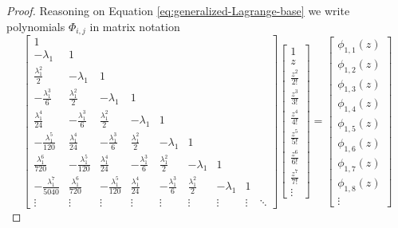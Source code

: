 \begin{proof}
Reasoning on Equation \ref{eq:generalized-Lagrange-base} we write polynomials
$\Phi_{i,j}$ in matrix notation
\begin{equation}
\label{eq:Ez-product}
    \left[\begin{matrix}1 &  &  &  &  &  &  & \\- \lambda_{1} & 1 &  &  &  &  &  & \\\frac{\lambda_{1}^{2}}{2} & - \lambda_{1} & 1 &  &  &  &  & \\- \frac{\lambda_{1}^{3}}{6} & \frac{\lambda_{1}^{2}}{2} & - \lambda_{1} & 1 &  &  &  & \\\frac{\lambda_{1}^{4}}{24} & - \frac{\lambda_{1}^{3}}{6} & \frac{\lambda_{1}^{2}}{2} & - \lambda_{1} & 1 &  &  & \\- \frac{\lambda_{1}^{5}}{120} & \frac{\lambda_{1}^{4}}{24} & - \frac{\lambda_{1}^{3}}{6} & \frac{\lambda_{1}^{2}}{2} & - \lambda_{1} & 1 &  & \\\frac{\lambda_{1}^{6}}{720} & - \frac{\lambda_{1}^{5}}{120} & \frac{\lambda_{1}^{4}}{24} & - \frac{\lambda_{1}^{3}}{6} & \frac{\lambda_{1}^{2}}{2} & - \lambda_{1} & 1 & \\- \frac{\lambda_{1}^{7}}{5040} & \frac{\lambda_{1}^{6}}{720} & - \frac{\lambda_{1}^{5}}{120} & \frac{\lambda_{1}^{4}}{24} & - \frac{\lambda_{1}^{3}}{6} & \frac{\lambda_{1}^{2}}{2} & - \lambda_{1} & 1 \\ \vdots & \vdots & \vdots & \vdots & \vdots & \vdots & \vdots & \vdots & \ddots  \end{matrix}\right] \left[\begin{matrix}1\\z\\\frac{z^{2}}{2!}\\\frac{z^{3}}{3!}\\\frac{z^{4}}{4!}\\\frac{z^{5}}{5!}\\\frac{z^{6}}{6!}\\\frac{z^{7}}{7!}\\\vdots\end{matrix}\right] = \left[\begin{matrix}\phi_{ 1, 1 }{\left (z \right )}\\\phi_{ 1, 2 }{\left (z \right )}\\\phi_{ 1, 3 }{\left (z \right )}\\\phi_{ 1, 4 }{\left (z \right )}\\\phi_{ 1, 5 }{\left (z \right )}\\\phi_{ 1, 6 }{\left (z \right )}\\\phi_{ 1, 7 }{\left (z \right )}\\\phi_{ 1, 8 }{\left (z \right )}\\\vdots\end{matrix}\right]

\end{equation}
\end{proof}

